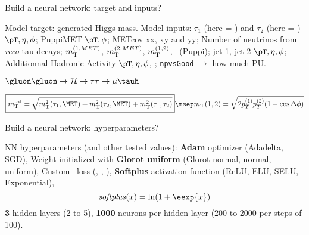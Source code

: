 \begin{frame}{Build a neural network: target and inputs?}

\begin{minipage}[c]{.49\textwidth}
\manip Model target: generated Higgs mass.
\manip Model inputs:
\submanip $\tau_1$ (here = \muon) and $\tau_2$ (here = \tauh) $\pT, \eta, \phi$;
\submanip PuppiMET $\pT, \phi$;
\submanip METcov xx, xy and yy;
\submanip Number of neutrinos from \emph{reco} tau decays;
\submanip $m_{\mathrm{T}}^{(1,MET)}$, $m_{\mathrm{T}}^{(2,MET)}$, $m_{\mathrm{T}}^{(1,2)}$, \mTtot\ (Puppi);
\submanip jet 1, jet 2 $\pT, \eta, \phi$;
\submanip Additionnal Hadronic Activity $\pT, \eta, \phi$, \Njetsr;
\submanip \texttt{npvsGood} $\rightarrow$ how much PU.
\end{minipage}
\hfill
\begin{minipage}[c]{.48\textwidth}
\begin{block}{$\gluon\gluon\to\Higgs\to\tau\tau\to\mu\tauh$}
\begin{center}

\vspace{2\baselineskip}



\vspace{2\baselineskip}

\end{center}
\end{block}
\end{minipage}

\vfill

\begin{equation*}
\boxed{\mTtot = \sqrt{\mT^2(\tau_1,\MET) + \mT^2(\tau_2,\MET) + \mT^2(\tau_1,\tau_2)}}
\msep
\mT(1,2) = \sqrt{2p_T^{(1)} p_T^{(2)} (1-\cos\Delta\phi)}
\end{equation*}

\end{frame}

\begin{frame}{Build a neural network: hyperparameters?}

\manip NN hyperparameters (and other tested values):
\submanip \textbf{Adam} optimizer (Adadelta, SGD),
\submanip Weight initialized with \textbf{Glorot uniform} (Glorot normal, normal, uniform),
\submanip Custom \LossMAPEsqrtb\ loss (\LossMAPE, \LossMAE, \LossMSE),
\submanip \textbf{Softplus} activation function (ReLU, ELU, SELU, Exponential),
\begin{equation*}
\mathit{softplus}(x) = \ln(1+\eexp{x})
\end{equation*}
\submanip \textbf{3} hidden layers (2 to 5),
\submanip \textbf{1000} neurons per hidden layer (200 to 2000 per steps of 100).
\end{frame}

